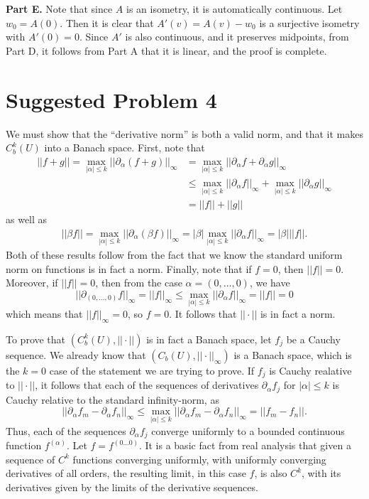 \documentclass[aps,pra,showpacs,notitlepage,onecolumn,superscriptaddress,nofootinbib]{revtex4-1}
\theoremstyle{definition}
\begin{document}
\noindent \textbf{Part E.} Note that since $A$ is an isometry, it is automatically continuous. Let $w_0 = A(0)$. Then it is clear that $A'(v) = A(v) - w_0$ is a surjective isometry with $A'(0) = 0$.
Since $A'$ is also continuous, and it preserves midpoints, from Part D, it follows from Part A that it is linear, and the proof is complete.

\section{Suggested Problem 4}

\noindent We must show that the ``derivative norm'' is both a valid norm, and that it makes $C_b^k(U)$ into a Banach space. First, note that
\begin{align}
  ||f + g|| = \max_{|\alpha| \leq k} ||\partial_{\alpha} (f + g) ||_{\infty} &= \max_{|\alpha| \leq k} ||\partial_{\alpha} f + \partial_{\alpha} g||_{\infty}
  \\ & \leq \max_{|\alpha| \leq k} ||\partial_{\alpha} f||_{\infty} + \max_{|\alpha| \leq k} ||\partial_{\alpha} g||_{\infty}
  \\ & = ||f|| + ||g||
\end{align}
as well as
\begin{align}
  ||\beta f|| = \max_{|\alpha| \leq k} ||\partial_{\alpha} (\beta f) ||_{\infty} = |\beta| \max_{|\alpha| \leq k} ||\partial_{\alpha} f||_{\infty} = |\beta| ||f||.
\end{align}
Both of these results follow from the fact that we know the standard uniform norm on functions is in fact a norm. Finally, note that if $f = 0$, then $||f|| = 0$. Moreover,
if $||f|| = 0$, then from the case $\alpha = (0, \dots, 0)$, we have
\begin{equation}
  ||\partial_{(0, \dots, 0)} f||_{\infty} = ||f||_{\infty} \leq \max_{|\alpha| \leq k} ||\partial_{\alpha} f||_{\infty} = ||f|| = 0
\end{equation}
which means that $||f||_{\infty} = 0$, so $f = 0$. It follows that $||\cdot||$ is in fact a norm.

To prove that $(C_b^k(U), ||\cdot||)$ is in fact a Banach space, let $f_j$ be a Cauchy sequence. We already know that $(C_b(U), ||\cdot||_{\infty})$ is a Banach space, which is
the $k = 0$ case of the statement we are trying to prove. If $f_j$ is Cauchy realative to $||\cdot||$, it follows that each of the sequences of derivatives $\partial_{\alpha} f_j$
for $|\alpha| \leq k$ is Cauchy relative to the standard infinity-norm, as
\begin{equation}
  ||\partial_{\alpha} f_m - \partial_{\alpha} f_n ||_{\infty} \leq \max_{|\alpha| \leq k} ||\partial_{\alpha} f_m - \partial_{\alpha} f_n ||_{\infty} = ||f_m - f_n||.
\end{equation}
Thus, each of the sequences $\partial_{\alpha} f_j$ converge uniformly to a bounded continuous function $f^{(\alpha)}$. Let $f = f^{(0 \dots 0)}$. It is a basic fact from real analysis that given a sequence
of $C^k$ functions converging uniformly, with uniformly converging derivatives of all orders, the resulting limit, in this case $f$, is also $C^k$, with its derivatives given by the limits
of the derivative sequences.
\end{document}

